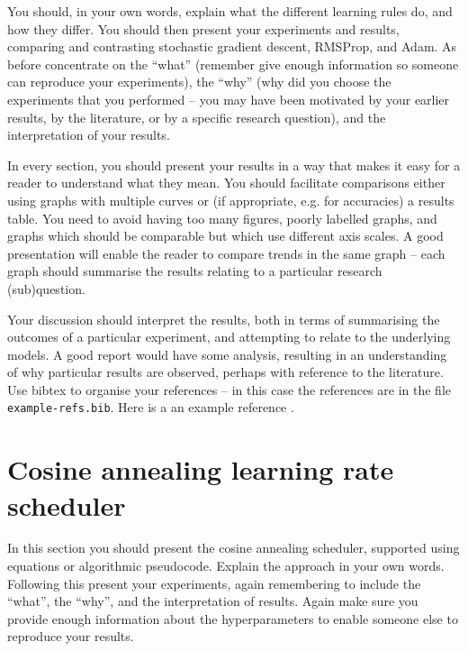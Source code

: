 \documentclass{article}
\begin{document}
You should, in your own words, explain what the different learning rules do, and how they differ.  You should then present your experiments and results, comparing and contrasting stochastic gradient descent, RMSProp, and Adam.  As before concentrate on the ``what'' (remember give enough information so someone can reproduce your experiments), the ``why'' (why did you choose the experiments that you performed -- you may have been motivated by your earlier results, by the literature, or by a specific research question), and the interpretation of your results.

In every section, you should present your results in a way that makes it easy for a reader to understand what they mean. You should facilitate comparisons either using graphs with multiple curves or (if appropriate, e.g. for accuracies) a results table. You need to avoid having too many figures, poorly labelled graphs, and graphs which should be comparable but which use different axis scales. A good presentation will enable the reader to compare trends in the same graph -- each graph should summarise the results relating to a particular research (sub)question.

Your discussion should interpret the results, both in terms of summarising the outcomes of a particular experiment, and attempting to relate to the underlying models. A good report would have some analysis, resulting in an understanding of why particular results are observed, perhaps with reference to the literature. Use bibtex to organise your references -- in this case the references are in the file \verb+example-refs.bib+.  Here is a an example reference \citep{langley00}.  

\section{Cosine annealing learning rate scheduler}
In this section you should present the cosine annealing scheduler,  supported using equations or algorithmic pseudocode.  Explain the approach in your own words.  Following this present your experiments, again remembering to include the ``what'', the ``why'', and the interpretation of results.  Again make sure you provide enough information about the hyperparameters to enable someone else to reproduce your results.
\end{document}
